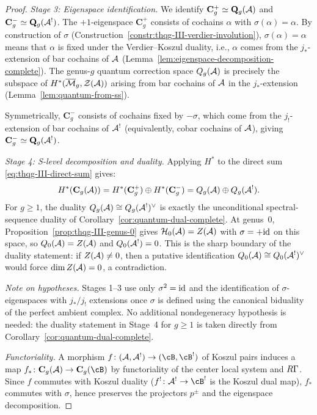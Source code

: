\begin{proof}
\emph{Stage 3: Eigenspace identification.}
We identify $\mathbf{C}_g^+ \simeq \mathbf{Q}_g(\mathcal{A})$ and
$\mathbf{C}_g^- \simeq \mathbf{Q}_g(\mathcal{A}^!)$.
The $+1$-eigenspace $\mathbf{C}_g^+$ consists of cochains
$\alpha$ with $\sigma(\alpha) = \alpha$. By construction
of $\sigma$
(Construction~\ref{constr:thqg-III-verdier-involution}),
$\sigma(\alpha) = \alpha$ means that $\alpha$ is fixed under
the Verdier--Koszul duality, i.e., $\alpha$ comes from the
$j_*$-extension of bar cochains of $\mathcal{A}$
(Lemma~\ref{lem:eigenspace-decomposition-complete}).
The genus-$g$ quantum correction space $Q_g(\mathcal{A})$ is precisely
the subspace of $H^*(\overline{\mathcal{M}}_g, \mathcal{Z}(\mathcal{A}))$
arising from bar cochains of $\mathcal{A}$ in the $j_*$-extension
(Lemma~\ref{lem:quantum-from-ss}).

Symmetrically, $\mathbf{C}_g^-$ consists of cochains fixed by
$-\sigma$, which come from the $j_!$-extension of bar
cochains of $\mathcal{A}^!$ (equivalently, cobar cochains of $\mathcal{A}$),
giving $\mathbf{C}_g^- \simeq \mathbf{Q}_g(\mathcal{A}^!)$.

\emph{Stage 4: S-level decomposition and duality.}
Applying $H^*$ to the direct sum
\eqref{eq:thqg-III-direct-sum} gives:
\[
H^*(\mathbf{C}_g(\mathcal{A}))
= H^*(\mathbf{C}_g^+) \oplus H^*(\mathbf{C}_g^-)
= Q_g(\mathcal{A}) \oplus Q_g(\mathcal{A}^!).
\]
For $g \ge 1$, the duality
$Q_g(\mathcal{A}) \cong Q_g(\mathcal{A}^!)^{\vee}$ is exactly the
unconditional spectral-sequence duality of
Corollary~\ref{cor:quantum-dual-complete}.
At genus~$0$, Proposition~\ref{prop:thqg-III-genus-0} gives
$\mathcal{H}_0(\mathcal{A}) = Z(\mathcal{A})$ with $\sigma = +\mathrm{id}$ on this space,
so
$Q_0(\mathcal{A}) = Z(\mathcal{A})$ and $Q_0(\mathcal{A}^!) = 0$.
This is the sharp boundary of the duality statement: if
$Z(\mathcal{A}) \neq 0$, then a putative identification
$Q_0(\mathcal{A}) \cong Q_0(\mathcal{A}^!)^{\vee}$ would force
$\dim Z(\mathcal{A}) = 0$, a contradiction.

\emph{Note on hypotheses.}
Stages 1--3 use only $\sigma^2 = \mathrm{id}$ and the
identification of $\sigma$-eigenspaces with $j_*/j_!$
extensions once $\sigma$ is defined using the canonical
biduality of the perfect ambient complex.
No additional nondegeneracy hypothesis is needed: the duality
statement in Stage~4 for $g \ge 1$ is taken directly from
Corollary~\ref{cor:quantum-dual-complete}.

\emph{Functoriality.}
A morphism $f \colon (\cA, \cA^!) \to (\cB, \cB^!)$
of Koszul pairs induces a map
$f_* \colon \mathbf{C}_g(\cA) \to \mathbf{C}_g(\cB)$
by functoriality of the center local system and $R\Gamma$.
Since $f$ commutes with Koszul duality
($f^! \colon \cA^! \to \cB^!$ is the Koszul dual map),
$f_*$ commutes with $\sigma$, hence preserves the
projectors $p^\pm$ and the eigenspace decomposition.
\end{proof}

